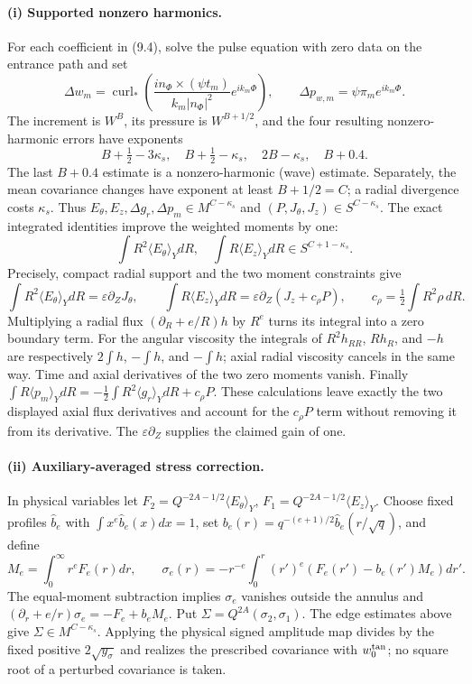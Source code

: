 \documentclass[10pt,a4paper]{article}
\begin{document}
\paragraph{(i) Supported nonzero harmonics.}
For each coefficient in (9.4), solve the pulse equation with zero data on the
entrance path and set
\[
 \Delta w_m=\operatorname{curl}_*\!\left(\frac{in_\Phi\times(\psi t_m)}{k_m|n_\Phi|^2}e^{ik_m\Phi}\right),
 \qquad \Delta p_{w,m}=\psi\pi_me^{ik_m\Phi}.
\]
The increment is $W^B$, its pressure is $W^{B+1/2}$, and the four resulting
nonzero-harmonic errors have exponents
\[
 B+\tfrac12-3\kappa_s,\quad B+\tfrac12-\kappa_s,\quad 2B-\kappa_s,\quad B+0.4 .
\]
The last $B+0.4$ estimate is a nonzero-harmonic (wave) estimate. Separately, the mean covariance changes have exponent at least $B+1/2=C$; a radial divergence costs $\kappa_s$. Thus $E_\theta,E_z,\Delta g_r,\Delta p_m\in M^{C-\kappa_s}$ and $(P,J_\theta,J_z)\in S^{C-\kappa_s}$. The exact integrated identities improve
the weighted moments by one:
\[
 \int R^2\langle E_\theta\rangle_YdR,\quad
\int R\langle E_z\rangle_YdR\in S^{C+1-\kappa_s}.                \tag{9.12}
\]
Precisely, compact radial support and the two moment constraints give
\[
\int R^2\langle E_\theta\rangle_YdR
=\varepsilon\partial_ZJ_\theta,\qquad
\int R\langle E_z\rangle_YdR
=\varepsilon\partial_Z(J_z+c_\rho P),\qquad
c_\rho=\tfrac12\int R^2\rho\,dR .
\]
Multiplying a radial flux $(\partial_R+e/R)h$ by $R^e$ turns its
integral into a zero boundary term. For the angular viscosity the
integrals of $R^2h_{RR}$, $Rh_R$, and $-h$ are respectively
$2\int h$, $-\int h$, and $-\int h$; axial radial viscosity cancels
in the same way. Time and axial derivatives of the two zero moments
vanish. Finally
$\int R\langle p_m\rangle_YdR
=-\frac12\int R^2\langle g_r\rangle_YdR+c_\rho P$.
These calculations leave exactly the two displayed axial flux
derivatives and account for the $c_\rho P$ term without removing it
from its derivative. The $\varepsilon\partial_Z$ supplies the claimed
gain of one.

\paragraph{(ii) Auxiliary-averaged stress correction.}
In physical variables let $F_2=Q^{-2A-1/2}\langle E_\theta\rangle_Y$,
$F_1=Q^{-2A-1/2}\langle E_z\rangle_Y$.  Choose fixed profiles $\widehat b_e$
with $\int x^e\widehat b_e(x)dx=1$, set
$b_e(r)=q^{-(e+1)/2}\widehat b_e(r/\sqrt q)$, and define
\[
 M_e=\int_0^\infty r^eF_e(r)dr,\qquad
 \sigma_e(r)=-r^{-e}\int_0^r(r')^e(F_e(r')-b_e(r')M_e)dr'.
\]
The equal-moment subtraction implies $\sigma_e$ vanishes outside the annulus and
$(\partial_r+e/r)\sigma_e=-F_e+b_eM_e$.  Put
$\Sigma=Q^{2A}(\sigma_2,\sigma_1)$.  The edge estimates above give
$\Sigma\in M^{C-\kappa_s}$.  Applying the physical signed amplitude map divides
by the fixed positive $2\sqrt{y_\sigma}$ and realizes the prescribed covariance
with $w_0^{\rm tan}$; no square root of a perturbed covariance is taken.
\end{document}
